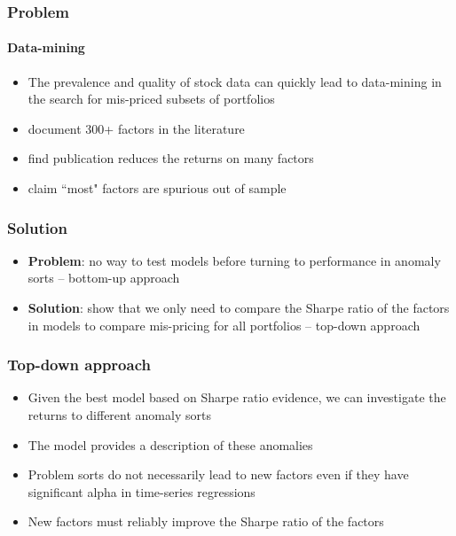 \documentclass[notes]{beamer}  %
\begin{document}
\begin{frame} \frametitle{Problem} \framesubtitle{Data-mining}
  \begin{itemize}
    \item The prevalence and quality of stock data can quickly lead to
    data-mining in the search for mis-priced subsets of portfolios
    \item \textcite{harvey2016and} document 300+ factors in the literature
    \item \textcite{mclean2016does} find publication reduces the returns on
    many factors
    \item \textcite{linnainmaa2016history} claim ``most" factors are spurious
    out of sample
  \end{itemize}
\end{frame}


\begin{frame} \frametitle{Solution}
  \begin{itemize}
    \item \textbf{Problem}:
    no way to test models before turning to performance in anomaly sorts
    -- bottom-up approach
    \item \textbf{Solution}:
    \textcite{barillas2016alpha} show that we only need to compare the Sharpe
    ratio of the factors in models to compare mis-pricing for all portfolios
    -- top-down approach
  \end{itemize}
\end{frame}

\begin{frame} \frametitle{Top-down approach}
  \begin{itemize}
    \item Given the best model based on Sharpe ratio evidence,
    we can investigate the returns to different anomaly sorts
    \item The model provides a description of these anomalies
    \item Problem sorts do not necessarily lead to new factors even if they
    have significant alpha in time-series regressions
    \item New factors must reliably improve the Sharpe ratio of the factors
  \end{itemize}
\end{frame}
\end{document}
